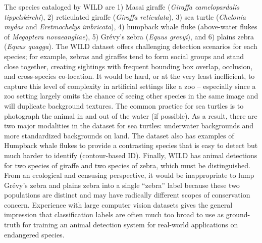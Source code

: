 The species cataloged by WILD are 1) Masai giraffe (\textit{Giraffa camelopardalis tippelskirchi}), 2) reticulated giraffe (\textit{Giraffa reticulata}), 3) sea turtle (\textit{Chelonia mydas} and \textit{Eretmochelys imbricata}), 4) humpback whale fluke (above-water flukes of \textit{Megaptera novaeangliae}), 5) Gr\'evy's zebra (\textit{Equus grevyi}), and 6) plains zebra (\textit{Equus quagga}).  The WILD dataset offers challenging detection scenarios for each species; for example, zebras and giraffes tend to form social groups and stand close together, creating sightings with frequent bounding box overlap, occlusion, and cross-species co-location.  It would be hard, or at the very least inefficient, to capture this level of complexity in artificial settings like a zoo -- especially since a zoo setting largely omits the chance of seeing other species in the same image and will duplicate background textures.  The common practice for sea turtles is to photograph the animal in and out of the water (if possible).  As a result, there are two major modalities in the dataset for sea turtles: underwater backgrounds and more standardized backgrounds on land.  The dataset also has examples of Humpback whale flukes to provide a contrasting species that is easy to detect but much harder to identify (contour-based ID). Finally, WILD has animal detections for two species of giraffe and two species of zebra, which must be distinguished.  From an ecological and censusing perspective, it would be inappropriate to lump Gr\'evy's zebra and plains zebra into a single ``zebra'' label because these two populations are distinct and may have radically different scopes of conservation concern.  Experience with large computer vision datasets gives the general impression that classification labels are often much too broad to use as ground-truth for training an animal detection system for real-world applications on endangered species.

